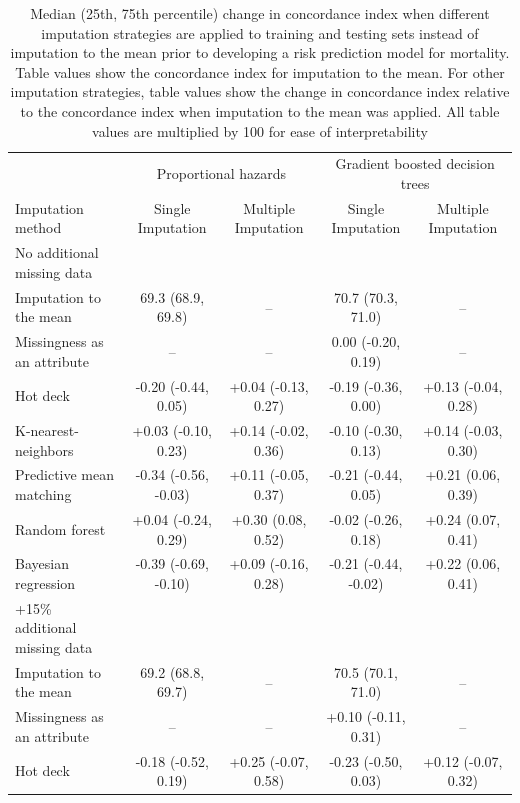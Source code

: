 \documentclass{article}
\begin{document}
\begin{table} 
 \caption{Median (25th, 75th percentile) change in concordance index when different imputation strategies are applied to training and testing sets instead of imputation to the mean prior to developing a risk prediction model for mortality. Table values show the concordance index for imputation to the mean. For other imputation strategies, table values show the change in concordance index relative to the concordance index when imputation to the mean was applied. All table values are multiplied by 100 for ease of interpretability} 
\label{tbl_md_strat_dead_auc} 
 
\begin{tabular}{lcccc}
\toprule
& \multicolumn{2}{c}{Proportional hazards} & \multicolumn{2}{c}{Gradient boosted decision trees} \\ 
 \cmidrule(lr){2-3}\cmidrule(lr){4-5}
Imputation method & Single Imputation & Multiple Imputation & Single Imputation & Multiple Imputation \\ 
\midrule
\multicolumn{1}{l}{No additional missing data} \\ 
\midrule
Imputation to the mean & 69.3 (68.9, 69.8) & -- & 70.7 (70.3, 71.0) & -- \\ 
Missingness as an attribute & -- & -- & 0.00 (-0.20, 0.19) & -- \\ 
Hot deck & -0.20 (-0.44, 0.05) & +0.04 (-0.13, 0.27) & -0.19 (-0.36, 0.00) & +0.13 (-0.04, 0.28) \\ 
K-nearest-neighbors & +0.03 (-0.10, 0.23) & +0.14 (-0.02, 0.36) & -0.10 (-0.30, 0.13) & +0.14 (-0.03, 0.30) \\ 
Predictive mean matching & -0.34 (-0.56, -0.03) & +0.11 (-0.05, 0.37) & -0.21 (-0.44, 0.05) & +0.21 (0.06, 0.39) \\ 
Random forest & +0.04 (-0.24, 0.29) & +0.30 (0.08, 0.52) & -0.02 (-0.26, 0.18) & +0.24 (0.07, 0.41) \\ 
Bayesian regression & -0.39 (-0.69, -0.10) & +0.09 (-0.16, 0.28) & -0.21 (-0.44, -0.02) & +0.22 (0.06, 0.41) \\ 
\midrule
\multicolumn{1}{l}{+15\% additional missing data} \\ 
\midrule
Imputation to the mean & 69.2 (68.8, 69.7) & -- & 70.5 (70.1, 71.0) & -- \\ 
Missingness as an attribute & -- & -- & +0.10 (-0.11, 0.31) & -- \\ 
Hot deck & -0.18 (-0.52, 0.19) & +0.25 (-0.07, 0.58) & -0.23 (-0.50, 0.03) & +0.12 (-0.07, 0.32) \\ 

\end{tabular}
\end{table}
\end{document}
